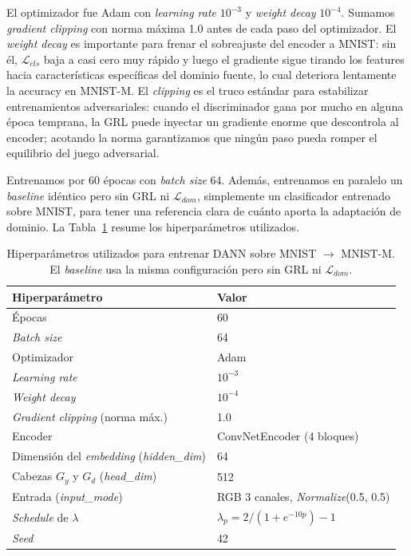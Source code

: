 \documentclass[12pt]{article}
\begin{document}
El optimizador fue Adam con \textit{learning rate} $10^{-3}$ y \textit{weight decay} $10^{-4}$. Sumamos \textit{gradient clipping} con norma máxima 1.0 antes de cada paso del optimizador. El \textit{weight decay} es importante para frenar el sobreajuste del encoder a MNIST: sin él, $\mathcal{L}_{cls}$ baja a casi cero muy rápido y luego el gradiente sigue tirando los features hacia características específicas del dominio fuente, lo cual deteriora lentamente la accuracy en MNIST-M. El \textit{clipping} es el truco estándar para estabilizar entrenamientos adversariales: cuando el discriminador gana por mucho en alguna época temprana, la GRL puede inyectar un gradiente enorme que descontrola al encoder; acotando la norma garantizamos que ningún paso pueda romper el equilibrio del juego adversarial.

Entrenamos por 60 épocas con \textit{batch size} 64. Además, entrenamos en paralelo un \textit{baseline} idéntico pero sin GRL ni $\mathcal{L}_{dom}$, simplemente un clasificador entrenado sobre MNIST, para tener una referencia clara de cuánto aporta la adaptación de dominio. La Tabla~\ref{tab:hp_dann} resume los hiperparámetros utilizados.

\begin{table}[h]
    \centering
    \begin{tabular}{ll}
        \hline
        Hiperparámetro                          & Valor                       \\
        \hline
        Épocas                                  & 60                          \\
        \textit{Batch size}                     & 64                          \\
        Optimizador                             & Adam                        \\
        \textit{Learning rate}                  & $10^{-3}$                   \\
        \textit{Weight decay}                   & $10^{-4}$                   \\
        \textit{Gradient clipping} (norma máx.) & 1.0                         \\
        Encoder                                 & ConvNetEncoder (4 bloques)  \\
        Dimensión del \textit{embedding} (\textit{hidden\_dim}) & 64          \\
        Cabezas $G_y$ y $G_d$ (\textit{head\_dim})              & 512         \\
        Entrada (\textit{input\_mode})          & RGB 3 canales, \textit{Normalize}(0.5, 0.5) \\
        \textit{Schedule} de $\lambda$          & $\lambda_p = 2/(1+e^{-10p}) - 1$ \\
        \textit{Seed}                           & 42                          \\
        \hline
    \end{tabular}
    \caption{Hiperparámetros utilizados para entrenar DANN sobre MNIST $\rightarrow$ MNIST-M. El \textit{baseline} usa la misma configuración pero sin GRL ni $\mathcal{L}_{dom}$.}
    \label{tab:hp_dann}
\end{table}
\end{document}
